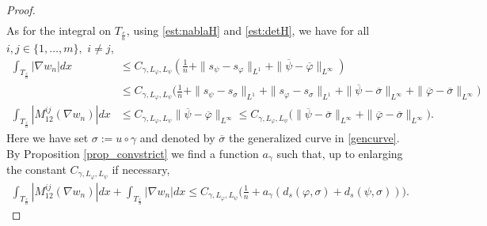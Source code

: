 \documentclass[a4paper,11pt]{article}
\numberwithin{equation}{section}
\def\det{\,{\rm det\ }}
\begin{document}
\begin{proof}
\begin{align}
\end{align}
	As for the integral on  $T_{\frac cn}$, using \eqref{est:nablaH} and \eqref{est:detH},  we have for all $i,j\in \{1,\dots,m\},$ $i\neq j$,
	\begin{align}\label{261}
		\int_{T_{\frac{c}{n}}}|\nabla w_{n}|dx&\leq C_{\gamma,L_\varphi,L_\psi}(\frac{1}{n}+\|s_{\psi}-s_{\varphi}\|_{L^1}+\|{\overline \psi}-{\overline \varphi}\|_{L^\infty})\nonumber\\
		&\leq C_{\gamma,L_\varphi,L_\psi}\big(\frac1n+\|s_{\psi}-s_{\sigma}\|_{L^1}+\|s_{\varphi}-s_\sigma\|_{L^1}+\|{\overline \psi}-{\overline\sigma}\|_{L^\infty}+\|{\overline \varphi}-{\overline\sigma}\|_{L^\infty}\big)\nonumber\\
		\int_{T_{\frac{c}{n}}}|M_{12}^{ij}(\nabla w_{n})|dx&\leq C_{\gamma,L_\varphi,L_\psi}\|{\overline \psi}-{\overline \varphi}\|_{L^\infty}\leq C_{\gamma,L_\varphi,L_\psi}\big(\|{\overline \psi}-{\overline \sigma}\|_{L^\infty}+\|{\overline \varphi}-{\overline \sigma}\|_{L^\infty}\big).
	\end{align}
	Here we have set $\sigma:=u\circ \gamma$ and denoted by $\overline \sigma$ the generalized curve in \eqref{gencurve}. By Proposition \ref{prop_convstrict} we find a function $a_\gamma$ such that, up to enlarging the constant $C_{\gamma,L_\varphi,L_\psi}$ if necessary, 
	\begin{align}\label{265}
		\int_{T_{\frac{c}{n}}}|M_{12}^{ij}(\nabla w_{n})|dx+\int_{T_{\frac{c}{n}}}|\nabla w_{n}|dx\leq C_{\gamma,L_\varphi,L_\psi}\big(\frac{1}{n}+a_\gamma(d_s(\varphi,\sigma)+d_s(\psi,\sigma))\big).

\end{align}
\end{proof}
\end{document}
